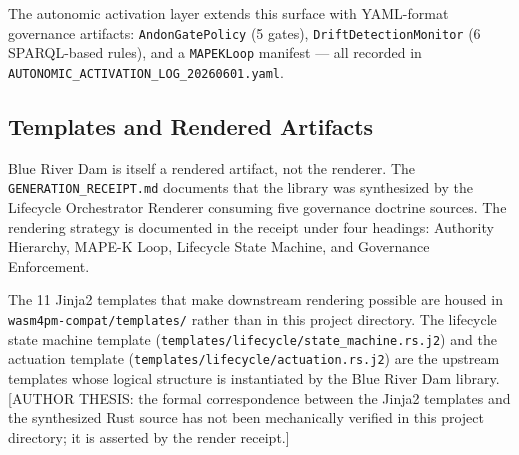 The autonomic activation layer extends this surface with YAML-format governance
artifacts: \texttt{AndonGatePolicy} (5 gates), \texttt{DriftDetectionMonitor}
(6 SPARQL-based rules), and a \texttt{MAPEKLoop} manifest --- all recorded in
\texttt{AUTONOMIC\_ACTIVATION\_LOG\_20260601.yaml}.

\subsection{Templates and Rendered Artifacts}
\label{sec:blue-river-dam-implementation-templates}

Blue River Dam is itself a rendered artifact, not the renderer. The
\texttt{GENERATION\_RECEIPT.md} documents that the library was synthesized
by the Lifecycle Orchestrator Renderer consuming five governance doctrine
sources. The rendering strategy is documented in the receipt under four
headings: Authority Hierarchy, MAPE-K Loop, Lifecycle State Machine, and
Governance Enforcement.

The 11 Jinja2 templates that make downstream rendering possible are housed in
\texttt{wasm4pm-compat/templates/} rather than in this project directory.
The lifecycle state machine template
(\texttt{templates/lifecycle/state\_machine.rs.j2}) and the actuation template
(\texttt{templates/lifecycle/actuation.rs.j2}) are the upstream templates
whose logical structure is instantiated by the Blue River Dam library.
[AUTHOR THESIS: the formal correspondence between the Jinja2 templates and the
synthesized Rust source has not been mechanically verified in this project
directory; it is asserted by the render receipt.]
